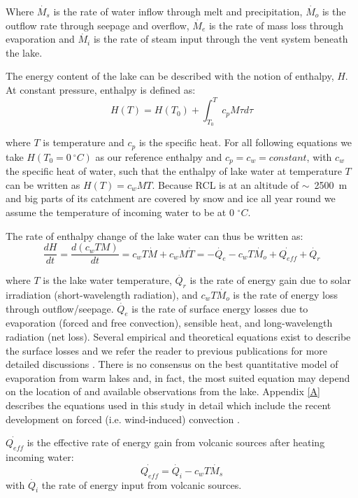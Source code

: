 \documentclass{bmc_template/bmcart}
\begin{document}
Where $\dot{M_s}$ is the rate of water inflow through melt and precipitation,
$\dot{M_o}$
is the outflow rate through seepage and overflow, $\dot{M_e}$ is the rate of mass
loss through evaporation and $\dot{M_i}$ is the rate of steam input through the vent
system beneath the lake.

The energy content of the lake can be described with the notion of
enthalpy, $H$. At constant pressure, enthalpy is defined as:
\begin{equation}
	H(T) = H(T_0) + \int_{T_0}^{T}c_pM\tau d\tau
\end{equation}

where $T$ is temperature and $c_p$ is the specific heat. For all following
equations we take $H(T_0=0~^{\circ}C)$ as our reference enthalpy and
$c_p=c_w=constant$, with $c_w$ the specific heat of water, such that the
enthalpy of lake water at temperature $T$ can be written as $H(T) = c_wMT$.
Because RCL is at an altitude of $\sim$~2500~m and big parts of its catchment
are covered by snow and ice all year round we assume the temperature of incoming
water to be at 0 $^{\circ}C$.

The rate of enthalpy change of the lake water can thus be written as:
\begin{equation}\label{ode_E}
    \frac{dH}{dt}=\frac{d(c_wTM)}{dt}=c_wT\dot{M} + c_wM\dot{T} =
	-\dot{Q_e} - c_wT\dot{M_o} + \dot{Q_{eff}} + \dot{Q_r}
\end{equation}
      
where $T$ is the lake water temperature, $\dot{Q_r}$ is the rate of energy gain
due to solar irradiation (short-wavelength radiation), and $c_wT\dot{M_o}$ is
the rate of energy loss through outflow/seepage. $\dot{Q_e}$ is the rate of
surface energy losses due to evaporation (forced and free convection), sensible
heat, and long-wavelength radiation (net loss). Several empirical and
theoretical equations exist to describe the surface losses and we refer the
reader to previous publications for more detailed discussions
\cite{Stevenson1992, hurstCraterLakeEnergy2015}. There is no consensus on the
best quantitative model of evaporation from warm lakes and, in fact, the most
suited equation may depend on the location of and available observations from
the lake. Appendix \ref{A} describes the equations used in this study in detail
which include the recent development on forced (i.e. wind-induced) convection
\cite{sartoriCriticalReviewEquations2000}. 

$\dot{Q_{eff}}$ is the effective rate of energy gain from volcanic sources after
heating incoming water:
\begin{equation}
	\dot{Q_{eff}}=\dot{Q_i} - c_wT\dot{M_s}
\end{equation}
with $\dot{Q_i}$ the rate of energy input from volcanic sources.
\end{document}
